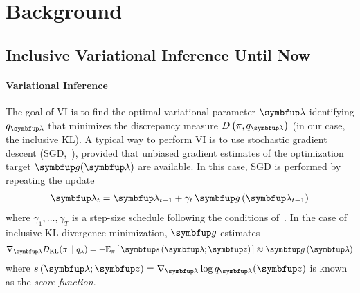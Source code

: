 
\section{Background}
\vspace{-0.05in}
\subsection{Inclusive Variational Inference Until Now}\label{section:ivi_previous}
\vspace{-0.05in}
\paragraph{Variational Inference}
The goal of VI is to find the optimal variational parameter \(\vlambda\) identifying \(q_{\vlambda}\) that minimizes the discrepancy measure \(D\left(\pi, q_{\vlambda}\right)\) (in our case, the inclusive KL).
A typical way to perform VI is to use stochastic gradient descent (SGD,~\citealt{robbins_stochastic_1951}), provided that unbiased gradient estimates of the optimization target \(\vg(\vlambda)\) are available.
In this case, SGD is performed by repeating the update
\vspace{-0.05in}
\begin{align}
  \vlambda_{t} = \vlambda_{t-1} + \gamma_{t} \, \vg\left(\vlambda_{t-1}\right)
\end{align}
where \(\gamma_1, \ldots, \gamma_T\) is a step-size schedule following the conditions of~\citet{robbins_stochastic_1951, bottou_online_1999}.
In the case of inclusive KL divergence minimization, \(\vg\) estimates
%
\vspace{-0.05in}
{
\begin{align}
  \nabla_{\vlambda} \DKL{\pi}{q_{\lambda}}
  = -\Esub{\pi}{ \vs\,(\vlambda; \vz) } 
  \approx \vg\left(\vlambda\right)
\end{align}
}%
%
where \(s\,(\vlambda;\vz) = \nabla_{\vlambda} \log q_{\vlambda}(\vz)\) is known as the \textit{score function}.

\vspace{-0.05in}
